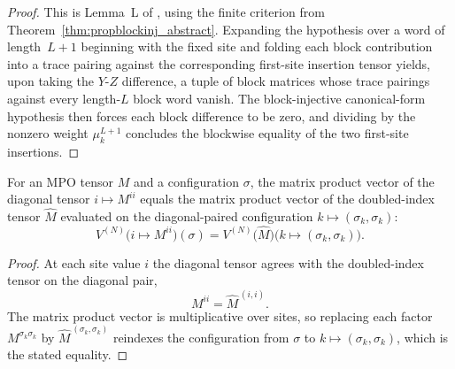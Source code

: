 \begin{proof}
    \leanok
    This is Lemma~L of \cite[Appendix~A]{Cirac2016MPDO_arXiv}, using the finite
    criterion from Theorem~\ref{thm:propblockinj_abstract}.
    Expanding the hypothesis over a word of length~$L+1$ beginning with the
    fixed site and folding each block contribution into a trace pairing
    against the corresponding first-site insertion tensor yields, upon taking the
    $Y$-$Z$ difference, a tuple of block matrices whose trace pairings
    against every length-$L$ block word vanish. The block-injective
    canonical-form hypothesis then forces each block difference to be zero, and
    dividing by the nonzero weight $\mu_k^{L+1}$ concludes the blockwise
    equality of the two first-site insertions.
\end{proof}

\begin{lemma}
    \label{lem:mpv_diagonal_tensor}
    \leanok
    For an MPO tensor $M$ and a configuration $\sigma$, the matrix product vector of
    the diagonal tensor $i\mapsto M^{ii}$ equals the matrix product vector of the
    doubled-index tensor $\widehat{M}$ evaluated on the diagonal-paired configuration
    $k\mapsto(\sigma_k,\sigma_k)$:
    \[
        V^{(N)}\bigl(i\mapsto M^{ii}\bigr)(\sigma)
        = V^{(N)}\bigl(\widehat{M}\bigr)\bigl(k\mapsto(\sigma_k,\sigma_k)\bigr).
    \]
\end{lemma}
\begin{proof}\leanok
    At each site value $i$ the diagonal tensor agrees with the doubled-index tensor
    on the diagonal pair,
    \[
        M^{ii} = \widehat{M}^{\,(i,i)}.
    \]
    The matrix product vector is multiplicative over sites, so replacing each factor
    $M^{\sigma_k\sigma_k}$ by $\widehat{M}^{\,(\sigma_k,\sigma_k)}$ reindexes the
    configuration from $\sigma$ to $k\mapsto(\sigma_k,\sigma_k)$, which is the stated
    equality.
\end{proof}

